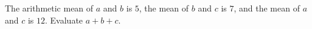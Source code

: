 The arithmetic mean of $a$ and $b$ is $5$, the mean of $b$ and $c$ is $7$, and the mean of $a$ and $c$ is $12$. Evaluate $a+b+c$.
